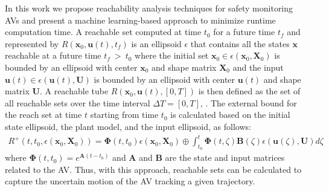 In this work we propose reachability analysis techniques for safety monitoring AVs and present a machine learning-based approach to minimize runtime computation time.
A reachable set computed at time $t_0$ for a future time $ t_f $ and represented by $R(\bm{x}_0, \bm{u}(t), t_f)$ is an ellipsoid $\epsilon$ that contains all the states $\bm{x}$ reachable at a future time $t_f ~>~ t_0$ where the initial set $ \bm{x}_0 \in \epsilon(\bm{x}_0, \bm{X}_0)$ is bounded by an ellipsoid with center $\bm{x}_0 $ and shape matrix $ \bm{X}_0 $ and the input $ \bm{u}(t) \in \epsilon(\bm{u}(t), \bm{U}) $ is bounded by an ellipsoid with center $ \bm{u}(t) $ and shape matrix $ \bm{U} $. 
A reachable tube $ R(\bm{x}_0, \bm{u}(t), [0,T] ) $ is then defined as the set of all reachable sets over the time interval $\Delta T = [0,T]$, \cite{esen17AHS, VaraiyaEllipsoid2006}. 
The external bound for the reach set at time $ t $ starting from time $t_0 $ is calculated based on the initial state ellipsoid, the plant model, and the input ellipsoid, as follows: 
\vspace{-5pt}
\begin{align*}
R^{+}(t, t_0, \epsilon(\bm{x}_0, \bm{X}_0)) = \bm{\Phi}(t,t_0)\epsilon(\bm{x}_0,\bm{X}_0)
\oplus \int_{t_0}^{t} \bm{\Phi}(t, \zeta) \bm{B}(\zeta) \epsilon(\bm{u}(\zeta), \bm{U})d\zeta
\end{align*}
where $\bm{\Phi}(t,t_0) = e^{\bm{A}(t-t_0)}$ and $\bm{A}$ and $\bm{B}$ are the state and input matrices related to the AV.
Thus, with this approach, reachable sets can be calculated to capture the uncertain motion of the AV tracking a given trajectory. 
